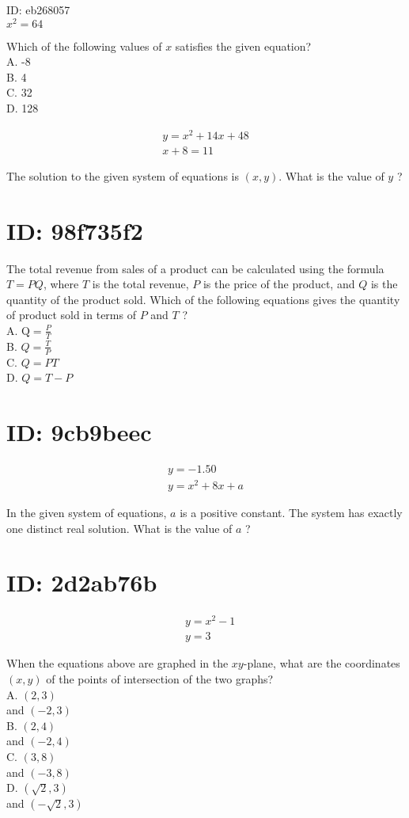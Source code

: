 ID: eb268057\\
$x^{2}=64$

Which of the following values of $x$ satisfies the given equation?\\
A. -8\\
B. 4\\
C. 32\\
D. 128

$$
\begin{gathered}
y=x^{2}+14 x+48 \\
x+8=11
\end{gathered}
$$

The solution to the given system of equations is $(x, y)$. What is the value of $y$ ?

\section*{ID: 98f735f2}
The total revenue from sales of a product can be calculated using the formula $T=P Q$, where $T$ is the total revenue, $P$ is the price of the product, and $Q$ is the quantity of the product sold. Which of the following equations gives the quantity of product sold in terms of $P$ and $T$ ?\\
A. $\mathrm{Q}=\frac{P}{T}$\\
B. $Q=\frac{T}{P}$\\
C. $Q=P T$\\
D. $Q=T-P$

\section*{ID: 9cb9beec}
$$
\begin{gathered}
y=-1.50 \\
y=x^{2}+8 x+a
\end{gathered}
$$

In the given system of equations, $a$ is a positive constant. The system has exactly one distinct real solution. What is the value of $a$ ?

\section*{ID: 2d2ab76b}
$$
\begin{aligned}
& y=x^{2}-1 \\
& y=3
\end{aligned}
$$

When the equations above are graphed in the $x y$-plane, what are the coordinates $(x, y)$ of the points of intersection of the two graphs?\\
A. $(2,3)$\\
and $(-2,3)$\\
B. $(2,4)$\\
and $(-2,4)$\\
C. $(3,8)$\\
and $(-3,8)$\\
D. $(\sqrt{2}, 3)$\\
and $(-\sqrt{2}, 3)$

